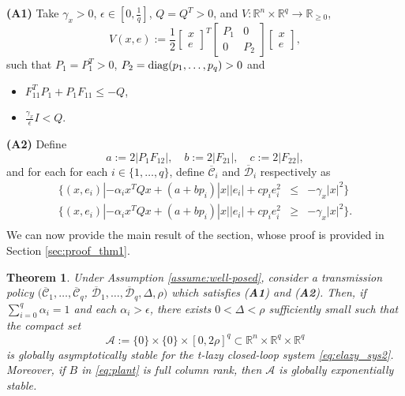 \documentclass[twocolumn]{autart}
\newtheorem{theorem}{Theorem}
\newcommand{\realn}{\real^n}
\newcommand\diag{{\rm diag}}
\newcommand\real{\ensuremath{{\mathbb R}}}
\newcommand\mymatrix[2]{\left[\begin{array}{#1} #2 \end{array}\right]}
\begin{document}
\noindent\textbf{(A1)} 
Take $\gamma_x>0$, $\epsilon\in[0,\frac{1}{q}]$, $Q=Q^T>0$, and 
$V:\realn\!\times\!\real^q \!\to\!\real_{\geq 0}$, 
\begin{equation}
 V(x,e) := \frac{1}{2} \mymatrix{c}{x \\ e}^T \mymatrix{cc}{P_1 & 0 \\ 0 & P_2} \mymatrix{c}{x \\ e}, \label{V_fullstate2} 
\end{equation}
such that $P_1\!=\!P_1^T\!>0$, $P_2=\diag(p_1,\dots,p_q)>0$ and 
\begin{itemize}
\item $F_{11}^TP_1+P_1F_{11} \leq -Q$,
\item $ \frac{\gamma_x}{\epsilon} I< Q$.
\end{itemize}

\noindent\textbf{(A2)} Define 
\begin{equation}
a  := 2|P_1 F_{12}|,\quad
b := 2 |F_{21}|,\quad 
c:=  2 |F_{22}|,
\end{equation}  
and for each 
for each $i\in\{1,\dots,q\}$, define  $\overline{\mathcal{C}}_i$ and  
$\overline{\mathcal{D}}_i$ respectively as 
\begin{equation}
\label{CDi_fullstate2}
\begin{array}{lll}
\{(x,e_i)|
-\alpha_ix^T\!Qx \!+\!  (a\!+\!bp_i) |x||e_i| \!+\! cp_ie_i^2 & \leq & -\gamma_x|x|^2 \}\\
\{(x,e_i)|
-\alpha_ix^T\!Qx \!+\!  (a\!+\!bp_i) |x||e_i| \!+\! cp_ie_i^2 & \geq & -\gamma_x|x|^2 \}.\\
\end{array}
\end{equation}
We can now provide the main result of the section, 
whose proof is provided in Section \ref{sec:proof_thm1}. 
\begin{theorem} 
\label{thm:GAS_asynchronous}
Under Assumption \ref{assume:well-posed}, consider a transmission policy 
$(\overline{\mathcal{C}}_1 , \dots , \overline{\mathcal{C}}_q$,
$ \overline{\mathcal{D}}_1 , \dots,\overline{\mathcal{D}}_q , \Delta,\rho)$
which satisfies (\textbf{A1}) and (\textbf{A2}). 
Then, if $\sum_{i=0}^q \alpha_i=1$ and each 
$\alpha_i>\epsilon$, there exists $0<\Delta<\rho$ sufficiently small
such that the compact set
\begin{equation}
\label{eq:A_async} 
\mathcal{A} := \{0\}\times \{0\} \times [0,2\rho]^q
\subset \realn\times\real^q\times\real^q 
\end{equation}
is globally asymptotically stable for the 
t-lazy closed-loop system \eqref{eq:elazy_sys2}. 
Moreover,
if $B$ in \eqref{eq:plant} is full column rank, then 
$\mathcal{A}$ is globally exponentially stable.
\end{theorem}
\end{document}

